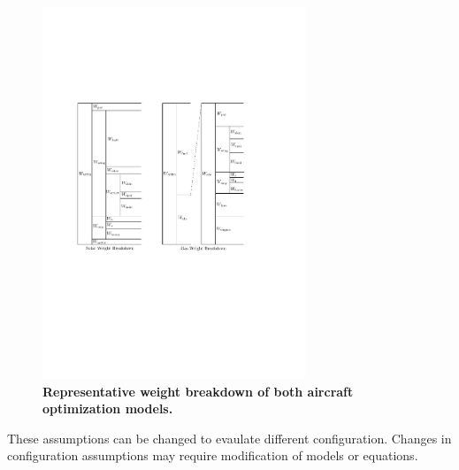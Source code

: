 \begin{figure}[H]
	\begin{center}
	\includegraphics[width=0.7\textwidth,natwidth=358,natheight=334]{wbreak.pdf}
   \caption{\textbf{Representative weight breakdown of both aircraft optimization models.}}
	\label{f:wbreak}
	\end{center}
\end{figure}


    
These assumptions can be changed to evaulate different configuration.  Changes in configuration assumptions may require modification of models or equations. 

